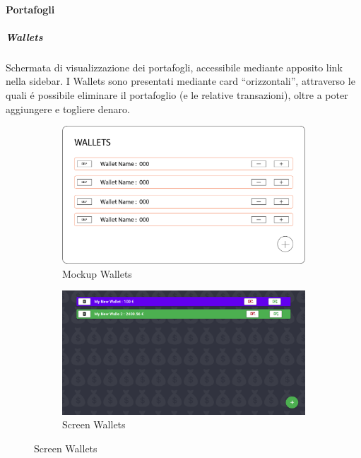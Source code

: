 \documentclass{report}
\begin{document}
\paragraph{Portafogli}
\subparagraph{Wallets}
Schermata di visualizzazione dei portafogli, accessibile mediante apposito link nella sidebar. I Wallets sono presentati mediante card “orizzontali”, attraverso le quali é possibile eliminare il portafoglio (e le relative transazioni), oltre a poter aggiungere e togliere denaro.
\begin{figure}[H]
    \begin{subfigure}
        \centering
        \includegraphics[scale=0.3]{images/mockups/Wallets.png}
        \caption{Mockup Wallets}
    \end{subfigure}
    \par\bigskip
    \begin{subfigure}
        \centering
        \includegraphics[scale=0.35]{images/screens/Wallets.png}
        \caption{Screen Wallets}
    \end{subfigure}
\end{figure}
\end{document}
